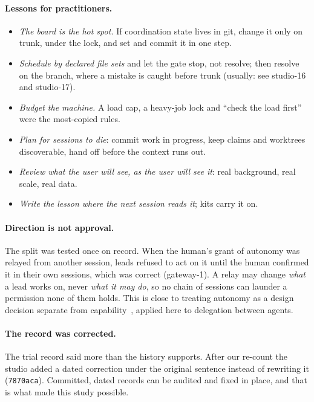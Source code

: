 \documentclass[11pt]{article}
\newcommand{\code}[1]{\texttt{#1}}
\begin{document}
\paragraph{Lessons for practitioners.}
\begin{itemize}
  \item \emph{The board is the hot spot.} If coordination state lives in git, change it
    only on trunk, under the lock, and set and commit it in one step.
  \item \emph{Schedule by declared file sets} and let the gate stop, not resolve; then
    resolve on the branch, where a mistake is caught before trunk (usually: see
    studio-16 and studio-17).
  \item \emph{Budget the machine.} A load cap, a heavy-job lock and ``check the load
    first'' were the most-copied rules.
  \item \emph{Plan for sessions to die}: commit work in progress, keep claims and
    worktrees discoverable, hand off before the context runs out.
  \item \emph{Review what the user will see, as the user will see it}: real background,
    real scale, real data.
  \item \emph{Write the lesson where the next session reads it}; kits carry it on.
\end{itemize}

\paragraph{Direction is not approval.}
The split was tested once on record. When the human's grant of autonomy was relayed from %
another session, leads refused to act on it until the human confirmed it in their own
sessions, which was correct (gateway-1). A relay may change \emph{what} a lead works on,
never \emph{what it may do}, so no chain of sessions can launder a permission none of them
holds. This is close to treating autonomy as a design decision separate from
capability~\citep{feng2025levels}, applied here to delegation between agents.

\paragraph{The record was corrected.}
The trial record said more than the history supports. After our re-count the studio
added a dated correction under the original sentence instead of rewriting it
(\code{7870aca}). Committed, dated records can be audited and fixed in place, and that is
what made this study possible.
\end{document}
